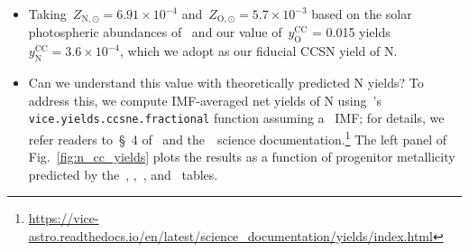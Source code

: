 \documentclass[ms.tex]{subfiles}
\begin{document}
\begin{itemize}
	\item Taking~$Z_{\text{N},\odot} = 6.91\times10^{-4}$ 
	and~$Z_{\text{O},\odot} = 5.7\times10^{-3}$ based on the solar photospheric 
	abundances of~\citet{Asplund2009} and our value of~$y_\text{O}^\text{CC}$ = 
	0.015 yields~$y_\text{N}^\text{CC} = 3.6\times10^{-4}$, which we adopt as 
	our fiducial CCSN yield of N. 

	\item Can we understand this value with theoretically predicted N yields? 
	To address this, we compute IMF-averaged net yields of N using~\vice's 
	\texttt{vice.yields.ccsne.fractional} function assuming 
	a~\citet{Kroupa2001} IMF; for details, we refer readers to~\S~4 
	of~\citet{Griffith2021} and the~\vice~science documentation.\footnote{
		\url{https://vice-astro.readthedocs.io/en/latest/science_documentation/yields/index.html} 
	} 
	The left panel of Fig.~\ref{fig:n_cc_yields} plots the results as a 
	function of progenitor metallicity predicted by the~\citet{Woosley1995}, 
	\citet{Nomoto2013},~\citet{Sukhbold2016}, and~\citet{Limongi2018} tables. 




\end{itemize}
\end{document}
